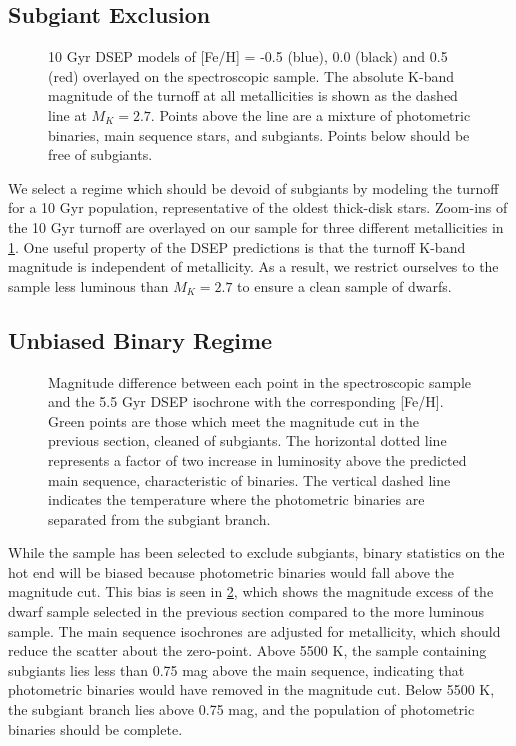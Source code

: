 \documentclass[manuscript]{aastex6}
\begin{document}
\subsection{Subgiant Exclusion}

\begin{figure}[htb]
    \centering
    \caption{10 Gyr DSEP models of [Fe/H] = -0.5 (blue), 0.0 (black) and 0.5
    (red) overlayed on the spectroscopic sample. The absolute K-band magnitude
    of the turnoff at all metallicities is shown as the dashed line at \(M_K =
2.7\). Points above the line are a mixture of photometric binaries, main
sequence stars, and subgiants. Points below should be free of 
subgiants.}\label{fig:turnoff}
\end{figure}

We select a regime which should be devoid of subgiants by modeling the turnoff
for a 10 Gyr population, representative of the oldest thick-disk stars.
Zoom-ins of the 10 Gyr turnoff are overlayed on our sample for three different
metallicities in \cref{fig:turnoff}. One useful property of the DSEP
predictions is that the turnoff K-band magnitude is independent of metallicity.
As a result, we restrict ourselves to the sample less luminous than \(M_K =
2.7\) to ensure a clean sample of dwarfs.

\subsection{Unbiased Binary Regime}

\begin{figure}[htb]
    \centering
    \caption{Magnitude difference between each point in the spectroscopic
    sample and the 5.5 Gyr DSEP isochrone with the corresponding [Fe/H]. Green
points are those which meet the magnitude cut in the previous section, cleaned
of subgiants. The horizontal dotted line represents a factor of two increase in
luminosity above the predicted main sequence, characteristic of binaries. The
vertical dashed line indicates the temperature where the photometric binaries
are separated from the subgiant branch.}
    \label{fig:binarycut}
\end{figure}

While the sample has been selected to exclude subgiants, binary statistics on
the hot end will be biased because photometric binaries would fall above the
magnitude cut. This bias is seen in \cref{fig:binarycut}, which shows the
magnitude excess of the dwarf sample selected in the previous section compared
to the more luminous sample. The main sequence isochrones are adjusted for
metallicity, which should reduce the scatter about the zero-point. Above 
5500 K, the sample containing subgiants lies less than 0.75 mag above the 
main sequence, indicating that photometric binaries would have removed in the
magnitude cut. Below 5500 K, the subgiant branch lies above 0.75 mag, and the
population of photometric binaries should be complete.
\end{document}

